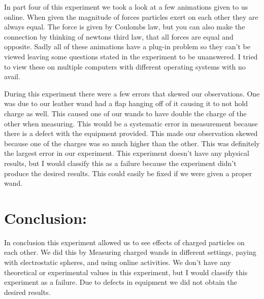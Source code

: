 \documentclass{article}
\begin{document}
In part four of this experiment we took a look at a few animations given to us online.  When given the magnitude of forces particles exert on each other they are always equal.  The force is given by Coulombs law, but you can also make the connection by thinking of newtons third law, that all forces are equal and opposite.  Sadly all of these animations have a plug-in problem so they can't be viewed leaving some questions stated in the experiment to be unanswered.  I tried to view these on multiple computers with different operating systems with no avail.  \par 

During this experiment there were a few errors that skewed our observations.  One was due to our leather wand had a flap hanging off of it causing it to not hold charge as well.  This caused one of our wands to have double the charge of the other when measuring.  This would be a systematic error in measurement because there is a defect with the equipment provided.  This made our observation skewed because one of the charges was so much higher than the other.  This was definitely the largest error in our experiment.  This experiment doesn't have any physical results, but I would classify this as a failure because the experiment didn't produce the desired results.  This could easily be fixed if we were given a proper wand.
  
\singlespace
\newpage

\section*{Conclusion:}
In conclusion this experiment allowed us to see effects of charged particles on each other.  We did this by Measuring charged wands in different settings, paying with electrostatic spheres, and using online activities.  We don't have any theoretical or experimental values in this experiment, but I would classify this experiment as a failure.  Due to defects in equipment we did not obtain the desired results.
\end{document}
